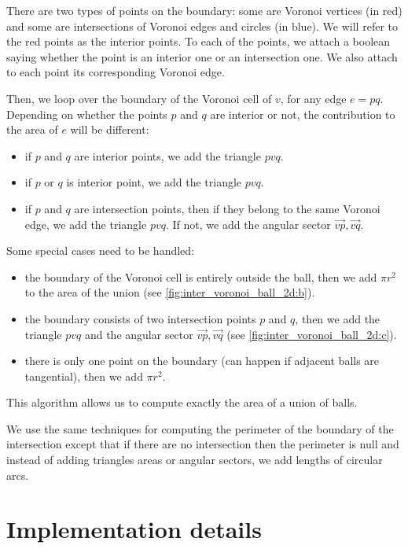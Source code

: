 There are two types of points on the boundary: some are Voronoi vertices (in
red) and some are intersections of Voronoi edges and circles (in blue). We will
refer to the red points as the interior points.
To each of the points, we attach a boolean saying whether the point is an
interior one or an intersection one. We also attach to each point its
corresponding Voronoi edge.

Then, we loop over the boundary of the Voronoi cell of $ v $, for any edge $ e =
pq $. Depending on whether the points $ p $ and $ q $ are interior or not, the
contribution to the area of $ e $ will be different:
\begin{itemize}
    \item if $ p $ and $ q $ are interior points, we add the triangle $ pvq $.
    \item if $ p $ or $ q $ is interior point, we add the triangle $ pvq $.
    \item if $ p $ and $ q $ are intersection points, then if they belong to the
        same Voronoi edge, we add the triangle $ pvq $. If not, we add the
        angular sector $ \vec{vp}, \vec{vq} $.
\end{itemize}

Some special cases need to be handled:
\begin{itemize}
    \item the boundary of the Voronoi cell is entirely outside the ball, then we
        add $ \pi r^2 $ to the area of the union (see
        \ref{fig:inter_voronoi_ball_2d:b}).
    \item the boundary consists of two intersection points $ p $ and $ q $, then
        we add the triangle $ pvq $ and the angular sector $ \vec{vp}, \vec{vq}
        $ (see \ref{fig:inter_voronoi_ball_2d:c}).
    \item there is only one point on the boundary (can happen if adjacent balls
        are tangential), then we add $ \pi r^2 $.
\end{itemize}

This algorithm allows us to compute exactly the area of a union of balls.

We use the same techniques for computing the perimeter of the boundary of the
intersection except that if there are no intersection then the perimeter is null
and instead of adding triangles areas or angular sectors, we add lengths of
circular arcs.

\section{Implementation details}

